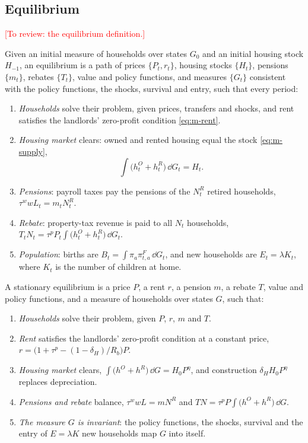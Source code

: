 \subsection{Equilibrium}
\label{sec:m-equilibrium}

\textcolor{red}{[To review: the equilibrium definition.]}

\begin{definition}
Given an initial measure of households over states $G_0$ and an initial housing stock $H_{-1}$, an equilibrium is
a path of prices $\{P_t,r_t\}$, housing stocks $\{H_t\}$, pensions $\{m_t\}$, rebates $\{T_t\}$, value
and policy functions, and measures $\{G_t\}$ consistent with the policy
functions, the shocks, survival and entry, such that every period:
\begin{enumerate}
\item \emph{Households} solve their problem, given prices, transfers and
shocks, and rent satisfies the landlords' zero-profit condition
\eqref{eq:m-rent}.
\item \emph{Housing market} clears: owned and rented housing equal the stock \eqref{eq:m-supply},
\[
 \int\bigl(h^O_t+h^R_t\bigr)\,\dd G_t=H_t .
\]
\item \emph{Pensions}: payroll taxes pay the pensions of the $N^R_t$ retired
households, $\tau^wwL_t=m_tN^R_t$.
\item \emph{Rebate}: property-tax revenue is paid to all $N_t$ households,
$T_tN_t=\tau^pP_t\int\bigl(h^O_t+h^R_t\bigr)\,\dd G_t$.
\item \emph{Population}: births are $B_t=\int\pi_a\pi^F_{t,a}\,\dd G_t$, and
new households are $E_t=\lambda K_t$, where $K_t$ is the number of children
at home.
\end{enumerate}
\end{definition}

\begin{definition}
A stationary equilibrium is a price $P$, a rent $r$, a pension $m$, a rebate
$T$, value and policy functions, and a measure of households over states
$G$, such that:
\begin{enumerate}
\item \emph{Households} solve their problem, given $P$, $r$, $m$ and $T$.
\item \emph{Rent} satisfies the landlords' zero-profit condition at a
constant price, $r=\bigl(1+\tau^p-(1-\delta_H)/R_b\bigr)P$.
\item \emph{Housing market} clears,
$\int\bigl(h^O+h^R\bigr)\,\dd G=H_0P^{\eta}$, and construction $\delta_HH_0P^{\eta}$ replaces depreciation.
\item \emph{Pensions and rebate} balance, $\tau^wwL=mN^R$ and
$TN=\tau^pP\int\bigl(h^O+h^R\bigr)\,\dd G$.
\item \emph{The measure $G$ is invariant}: the policy functions, the shocks,
survival and the entry of $E=\lambda K$ new households map $G$ into itself.
\end{enumerate}
\end{definition}

